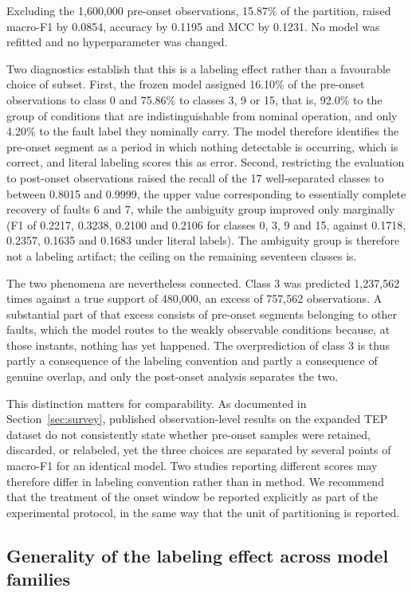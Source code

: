 \documentclass[10pt,twocolumn,a4paper]{article}
\begin{document}
Excluding the 1,600,000 pre-onset observations, 15.87\% of the partition,
raised macro-F1 by 0.0854, accuracy by 0.1195 and MCC by 0.1231. No model was
refitted and no hyperparameter was changed.

Two diagnostics establish that this is a labeling effect rather than a
favourable choice of subset. First, the frozen model assigned 16.10\% of the
pre-onset observations to class 0 and 75.86\% to classes 3, 9 or 15, that is,
92.0\% to the group of conditions that are indistinguishable from nominal
operation, and only 4.20\% to the fault label they nominally carry. The model
therefore identifies the pre-onset segment as a period in which nothing
detectable is occurring, which is correct, and literal labeling scores this as
error. Second, restricting the evaluation to post-onset observations raised the
recall of the 17 well-separated classes to between 0.8015 and 0.9999, the upper
value corresponding to essentially complete recovery of faults 6 and 7, while
the ambiguity group improved only marginally (F1 of 0.2217, 0.3238, 0.2100 and
0.2106 for classes 0, 3, 9 and 15, against 0.1718, 0.2357, 0.1635 and 0.1683
under literal labels). The ambiguity group is therefore not a labeling
artifact; the ceiling on the remaining seventeen classes is.

The two phenomena are nevertheless connected. Class 3 was predicted 1,237,562
times against a true support of 480,000, an excess of 757,562 observations. A
substantial part of that excess consists of pre-onset segments belonging to
other faults, which the model routes to the weakly observable conditions
because, at those instants, nothing has yet happened. The overprediction of
class 3 is thus partly a consequence of the labeling convention and partly a
consequence of genuine overlap, and only the post-onset analysis separates the
two.

This distinction matters for comparability. As documented in
Section~\ref{sec:survey}, published observation-level results on the expanded
TEP dataset do not consistently state whether pre-onset samples were retained,
discarded, or relabeled, yet the three choices are separated by several points
of macro-F1 for an identical model. Two studies reporting different scores may
therefore differ in labeling convention rather than in method. We recommend
that the treatment of the onset window be reported explicitly as part of the
experimental protocol, in the same way that the unit of partitioning is
reported.

\subsection{Generality of the labeling effect across model families}
\label{sec:generality}
\end{document}
